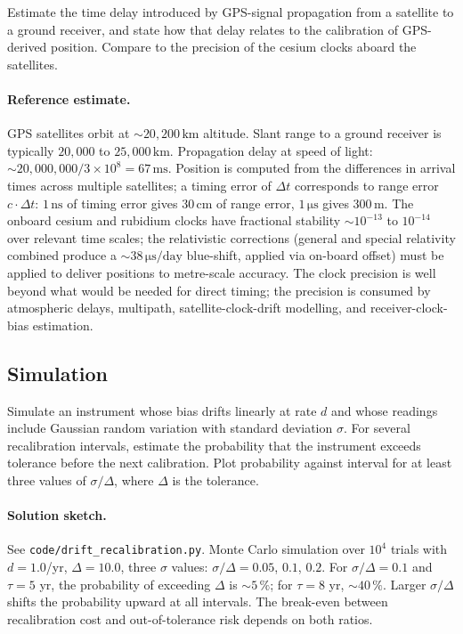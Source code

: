 \begin{exercise}
Estimate the time delay introduced by GPS-signal propagation from a
satellite to a ground receiver, and state how that delay relates to
the calibration of GPS-derived position. Compare to the precision
of the cesium clocks aboard the satellites.

\paragraph{Reference estimate.}
GPS satellites orbit at $\sim 20{,}200 \,\si{\kilo\meter}$ altitude.
Slant range to a ground receiver is typically $20{,}000$ to
$25{,}000 \,\si{\kilo\meter}$. Propagation delay at speed of light:
$\sim 20{,}000{,}000 / 3 \times 10^{8} = 67 \,\si{\milli\second}$.
Position is computed from the differences in arrival times across
multiple satellites; a timing error of $\Delta t$ corresponds to
range error $c \cdot \Delta t$: $1 \,\si{\nano\second}$ of timing
error gives $30 \,\si{\centi\meter}$ of range error, $1 \,\si{\micro
\second}$ gives $300 \,\si{\meter}$. The onboard cesium and rubidium
clocks have fractional stability $\sim 10^{-13}$ to $10^{-14}$ over
relevant time scales; the relativistic corrections (general and
special relativity combined produce a $\sim 38 \,\si{\micro\second}/
\text{day}$ blue-shift, applied via on-board offset) must be
applied to deliver positions to metre-scale accuracy. The clock
precision is well beyond what would be needed for direct timing;
the precision is consumed by atmospheric delays, multipath,
satellite-clock-drift modelling, and receiver-clock-bias estimation.
\end{exercise}

\subsection*{Simulation}

\begin{exercise}
Simulate an instrument whose bias drifts linearly at rate $d$ and
whose readings include Gaussian random variation with standard
deviation $\sigma$. For several recalibration intervals, estimate
the probability that the instrument exceeds tolerance before the
next calibration. Plot probability against interval for at least
three values of $\sigma / \Delta$, where $\Delta$ is the tolerance.

\paragraph{Solution sketch.} See \texttt{code/drift\_recalibration.py}.
Monte Carlo simulation over $10^4$ trials with $d = 1.0$/yr,
$\Delta = 10.0$, three $\sigma$ values: $\sigma/\Delta = 0.05$,
$0.1$, $0.2$. For $\sigma/\Delta = 0.1$ and $\tau = 5$ yr, the
probability of exceeding $\Delta$ is $\sim 5\,\%$; for $\tau = 8$
yr, $\sim 40\,\%$. Larger $\sigma/\Delta$ shifts the probability
upward at all intervals. The break-even between recalibration cost
and out-of-tolerance risk depends on both ratios.
\end{exercise}

